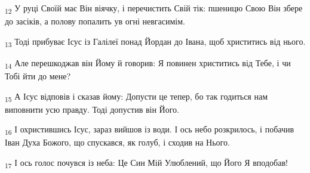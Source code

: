 \begin{tcolorbox}
\textsubscript{12} У руці Своїй має Він віячку, і перечистить Свій тік: пшеницю Свою Він збере до засіків, а полову попалить ув огні невгасимім.
\end{tcolorbox}
\begin{tcolorbox}
\textsubscript{13} Тоді прибуває Ісус із Галілеї понад Йордан до Івана, щоб христитись від нього.
\end{tcolorbox}
\begin{tcolorbox}
\textsubscript{14} Але перешкоджав він Йому й говорив: Я повинен христитись від Тебе, і чи Тобі йти до мене?
\end{tcolorbox}
\begin{tcolorbox}
\textsubscript{15} А Ісус відповів і сказав йому: Допусти це тепер, бо так годиться нам виповнити усю правду. Тоді допустив він Його.
\end{tcolorbox}
\begin{tcolorbox}
\textsubscript{16} І охристившись Ісус, зараз вийшов із води. І ось небо розкрилось, і побачив Іван Духа Божого, що спускався, як голуб, і сходив на Нього.
\end{tcolorbox}
\begin{tcolorbox}
\textsubscript{17} І ось голос почувся із неба: Це Син Мій Улюблений, що Його Я вподобав!
\end{tcolorbox}
